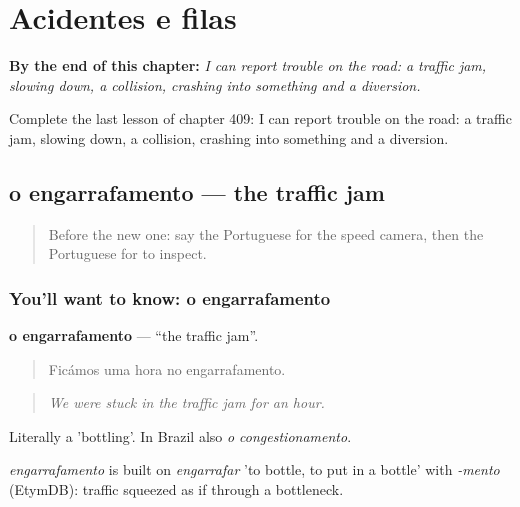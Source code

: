 
\chapter{Acidentes e filas}
\label{ch:pt-acidentes-e-filas}

\begin{chapteropening}
\textbf{By the end of this chapter:} \emph{I can report trouble on the road: a traffic jam, slowing down, a collision, crashing into something and a diversion.}

Complete the last lesson of chapter 409: I can report trouble on the road: a traffic jam, slowing down, a collision, crashing into something and a diversion.
\end{chapteropening}

\section[o engarrafamento]{o engarrafamento — the traffic jam}

\label{lesson:PT-C409-engarrafamento}



\begin{quote}
Before the new one: say the Portuguese for the speed camera, then the Portuguese for to inspect.
\end{quote}

\subsection*{You'll want to know: o engarrafamento}
\textbf{o engarrafamento} — \textquotedblleft{}the traffic jam\textquotedblright{}.

\begin{quote}
Ficámos uma hora no engarrafamento.
\end{quote}

\begin{quote}
\emph{We were stuck in the traffic jam for an hour.}
\end{quote}

Literally a 'bottling'. In Brazil also \emph{o congestionamento}.

\begin{cousinweb}
\emph{engarrafamento} is built on \emph{engarrafar} 'to bottle, to put in a bottle' with \emph{-mento} (EtymDB): traffic squeezed as if through a bottleneck.
\end{cousinweb}

